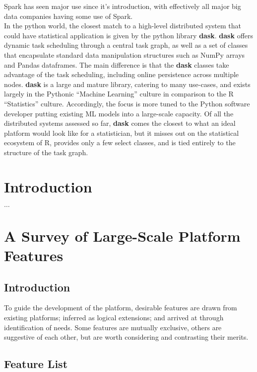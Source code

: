\documentclass[a4paper,10pt]{article}
\begin{document}
Spark has seen major use since it's introduction, with effectively all major big data companies having some use of Spark.\\

In the python world, the closest match to a high-level distributed system that could have statistical application is given by the python library \textbf{dask}\cite{rocklin2015dask}.
\textbf{dask} offers dynamic task scheduling through a central task graph, as well as a set of classes that encapsulate standard data manipulation structures such as NumPy arrays and Pandas dataframes. 
The main difference is that the \textbf{dask} classes take advantage of the task scheduling, including online persistence across multiple nodes.
\textbf{dask} is a large and mature library, catering to many use-cases, and exists largely in the Pythonic ``Machine Learning'' culture in comparison to the R ``Statistics'' culture.
Accordingly, the focus is more tuned to the Python software developer putting existing ML models into a large-scale capacity.
Of all the distributed systems assessed so far, \textbf{dask} comes the closest to what an ideal platform would look like for a statistician, but it misses out on the statistical ecosystem of R, provides only a few select classes, and is tied entirely to the structure of the task graph.

\section{Introduction}

\(\dots\)

\section{A Survey of Large-Scale Platform Features}

\subsection{Introduction}\label{sec:intro}

To guide the development of the platform, desirable features are drawn from
existing platforms; inferred as logical extensions; and arrived at through
identification of needs. Some features are mutually exclusive, others are
suggestive of each other, but are worth considering and contrasting their
merits.

\subsection{Feature List}\label{sec:feature-list}
\end{document}
